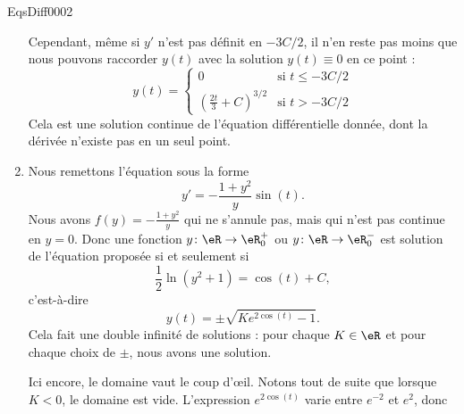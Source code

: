 \begin{corrige}{EqsDiff0002}
\begin{enumerate}
Cependant, même si $y'$ n'est pas définit en $-3C/2$, il n'en reste pas moins que nous pouvons raccorder $y(t)$ avec la solution $y(t)\equiv 0$ en ce point :
\begin{equation}
	y(t)=\begin{cases}
	0	&					\text{si }t\leq -3C/2\\
	\left( \frac{ 2t }{ 3 }+C \right)^{3/2}	&	\text{si }t>-3C/2
\end{cases}
\end{equation}
Cela est une solution continue de l'équation différentielle donnée, dont la dérivée n'existe pas en un seul point.

\item
Nous remettons l'équation sous la forme
\begin{equation}
	y'=-\frac{ 1+y^2 }{ y }\sin(t).
\end{equation}
Nous avons $f(y)=-\frac{ 1+y^2 }{ y }$ qui ne s'annule pas, mais qui n'est pas continue en $y=0$. Donc une fonction $y\colon \eR\to \eR^+_0$ ou $y\colon \eR\to \eR^-_0$ est solution de l'équation proposée si et seulement si
\begin{equation}
	\frac{ 1 }{2}\ln(y^2+1)=\cos(t)+C,
\end{equation}
c'est-à-dire
\begin{equation}		\label{EqSolGeneRacExpCis}
	y(t)=\pm\sqrt{K e^{2\cos(t)}-1}.
\end{equation}
Cela fait une double infinité de solutions : pour chaque $K\in\eR$ et pour chaque choix de $\pm$, nous avons une solution.

Ici encore, le domaine vaut le coup d'œil. Notons tout de suite que lorsque $K<0$, le domaine est vide. L'expression $ e^{2\cos(t)}$ varie entre $e^{-2}$ et $e^2$, donc
\begin{enumerate}


\end{enumerate}
\end{enumerate}
\end{corrige}
